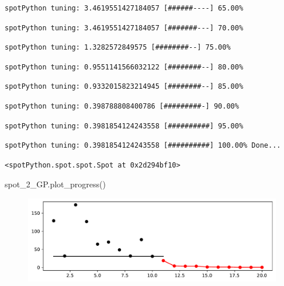 \documentclass[
  letterpaper,
  DIV=11,
  numbers=noendperiod]{scrreprt}
\newenvironment{Shaded}{\begin{snugshade}}{\end{snugshade}}
\newcommand{\NormalTok}[1]{\textcolor[rgb]{0.00,0.23,0.31}{#1}}
\begin{document}
\begin{verbatim}
spotPython tuning: 3.4619551427184057 [######----] 65.00% 
\end{verbatim}

\begin{verbatim}
spotPython tuning: 3.4619551427184057 [#######---] 70.00% 
\end{verbatim}

\begin{verbatim}
spotPython tuning: 1.3282572849575 [########--] 75.00% 
\end{verbatim}

\begin{verbatim}
spotPython tuning: 0.9551141566032122 [########--] 80.00% 
\end{verbatim}

\begin{verbatim}
spotPython tuning: 0.9332015823214945 [########--] 85.00% 
\end{verbatim}

\begin{verbatim}
spotPython tuning: 0.398788808400786 [#########-] 90.00% 
\end{verbatim}

\begin{verbatim}
spotPython tuning: 0.3981854124243558 [##########] 95.00% 
\end{verbatim}

\begin{verbatim}
spotPython tuning: 0.3981854124243558 [##########] 100.00% Done...
\end{verbatim}

\begin{verbatim}
<spotPython.spot.spot.Spot at 0x2d294bf10>
\end{verbatim}

\begin{Shaded}
\begin{Highlighting}[]
\NormalTok{spot\_2\_GP.plot\_progress()}
\end{Highlighting}
\end{Shaded}

\begin{figure}[H]

{\centering \includegraphics{010_num_spot_sklearn_surrogate_files/figure-pdf/cell-18-output-1.pdf}

}

\end{figure}
\end{document}
